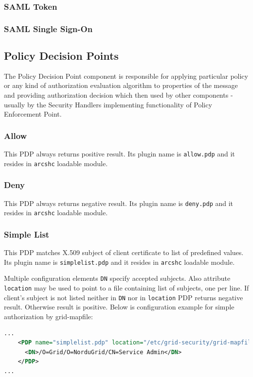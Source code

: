 \documentclass{article}
\begin{document}
\subsubsection{SAML Token}

\subsubsection{SAML Single Sign-On}

\subsection{Policy Decision Points}\label{sec:Policy Decision Points}
The Policy Decision Point component is responsible for applying particular
policy or any kind of authorization evaluation algorithm to properties 
of the message and providing authorization decision which then used by
other components - usually by the Security Handlers implementing 
functionality of Policy Enforcement Point.

\subsubsection{Allow}
This PDP always returns positive result. Its plugin name is \texttt{allow.pdp}
and it resides in \texttt{arcshc} loadable module.

\subsubsection{Deny}
This PDP always returns negative result. Its plugin name is \texttt{deny.pdp}
and it resides in \texttt{arcshc} loadable module.

\subsubsection{Simple List}
This PDP matches X.509 subject of client certificate to list of predefined values.
Its plugin name is \texttt{simplelist.pdp} and it resides in \texttt{arcshc} loadable
module.

Multiple configuration elements \texttt{DN} specify accepted subjects. Also attribute
\texttt{location} may be used to point to a file containing list of subjects, one
per line. If client's subject is not listed neither in \texttt{DN} nor in 
\texttt{location} PDP returns negative result. Otherwise result is positive. Below is
configuration example for simple authorization by grid-mapfile:
\begin{lstlisting}[language=xml]
...
    <PDP name="simplelist.pdp" location="/etc/grid-security/grid-mapfile">
      <DN>/O=Grid/O=NorduGrid/CN=Service Admin</DN>
    </PDP>
...
\end{lstlisting}
\end{document}
